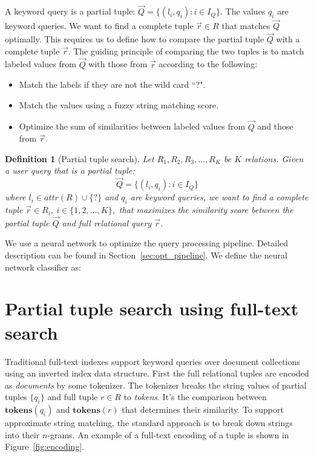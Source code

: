 \documentclass[conference]{IEEEtran}
\newtheorem{definition}{Definition}
\begin{document}
A keyword query is a partial tuple: $\vec Q = \{(l_i, q_i): i\in I_Q\}$.  The
values $q_i$ are keyword queries.
We want to find a complete tuple $\vec r \in R$ that matches $\vec Q$
optimally.  This requires us to define how to compare the partial tuple $\vec
Q$ with a complete tuple $\vec r$.  The guiding principle of comparing the two
tuples is to match labeled values from $\vec Q$ with those from $\vec r$
according to the following:
\begin{itemize}
    \item Match the labels if they are not the wild card ``$?$".
    \item Match the values using a fuzzy string matching score.
    \item Optimize the sum of similarities between labeled values from $\vec Q$ and those from $\vec r$.
\end{itemize}


\begin{definition}[Partial tuple search]
Let $R_1, R_2, R_3, \dots, R_K$ be $K$ relations. 
Given a user query that is a partial tuple: $$\vec Q = \{(l_i, q_i): i\in I_Q\}$$ 
where $l_i \in attr(R)\cup\{?\}$ and $q_i$ are keyword queries, 
we want to find a complete tuple $\vec r \in R_i,\ i\in\{1, 2, \dots, K\},$ that maximizes the similarity score
between the partial tuple $\Vec Q$ and full relational query $\vec r$.
\end{definition}

We use a neural network to optimize the query processing pipeline. Detailed
description can be found in  Section~\ref{sec:opt_pipeline}. We define the
neural network classifier as:


\section{Partial tuple search using full-text search}
\label{sec:search_fulltext_index}
Traditional full-text indexes support keyword queries
over document collections using an inverted index data structure.  First the full relational
tuples are encoded as {\em documents} by some tokenizer.  The tokenizer breaks the string values of partial tuples
$\{q_i\}$ and full tuple $r\in R$ to {\em tokens}.  It's the comparison between $\mathbf{tokens}(q_i)$ and $\mathbf{tokens}(r)$
that determines their similarity.  To support approximate string matching, the standard approach \cite{kim2007n,kondrak2005n}
is to break down strings into their $n$-grams.  An example of a full-text encoding of a tuple is shown in Figure~\ref{fig:encoding}.
\end{document}
